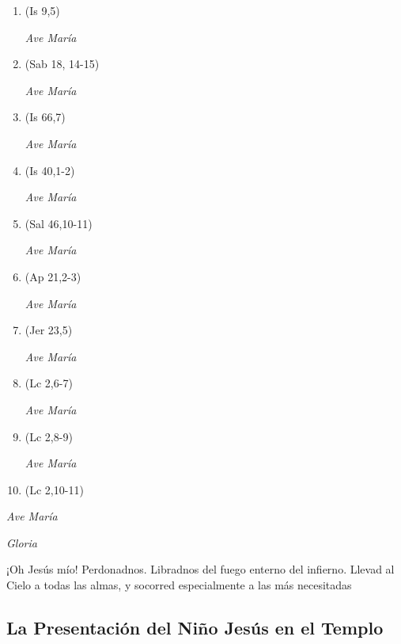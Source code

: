 \documentclass[a4paper,11pt, oneside]{report}
\begin{document}
        \begin{enumerate}
          
          \item (Is 9,5)
          
          \textit{Ave María}

          \item (Sab 18, 14-15)
          
          \textit{Ave María}

          \item (Is 66,7)
          
          \textit{Ave María}

          \item (Is 40,1-2)
          
          \textit{Ave María}

          \item (Sal 46,10-11)

          \textit{Ave María}

          \item (Ap 21,2-3)
          
          \textit{Ave María}

          \item (Jer 23,5)

          \textit{Ave María}

          \item (Lc 2,6-7)
          
          \textit{Ave María}

          \item (Lc 2,8-9)
          
          \textit{Ave María}

          \item (Lc 2,10-11)

        \end{enumerate}

        \textit{Ave María} \par
        \indent\textit{Gloria} \par
        \indent¡Oh Jesús mío! Perdonadnos. Libradnos del fuego enterno del infierno. Llevad al Cielo a todas las almas, y socorred especialmente a las más 
        necesitadas

      \subsection*{La Presentación del Niño Jesús en el Templo}
      
\end{document}
